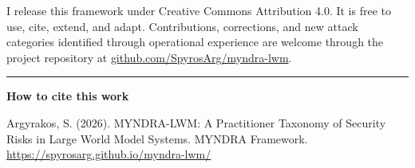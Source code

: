 \documentclass[11pt,a4paper]{article}
\begin{document}
I release this framework under Creative Commons Attribution 4.0. It is free to use, cite, extend, and adapt. Contributions, corrections, and new attack categories identified through operational experience are welcome through the project repository at \href{https://github.com/SpyrosArg/myndra-lwm}{github.com/SpyrosArg/myndra-lwm}.

\vspace{2em}
\hrule
\vspace{1em}

\noindent\textbf{How to cite this work}

\vspace{0.5em}
\noindent\small Argyrakos, S. (2026). MYNDRA-LWM: A Practitioner Taxonomy of Security Risks in Large World Model Systems. MYNDRA Framework. \url{https://spyrosarg.github.io/myndra-lwm/}
\end{document}
